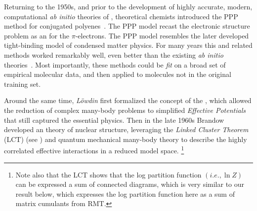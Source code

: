 Returning to the 1950s, and prior to the development of highly accurate, modern,
computational \emph{ab initio} theories of \QuantumChemistry, %
theoretical chemists introduced the \SemiEmpirical PPP method
for
conjugated polyenes~\cite{PariserParr53}.
The PPP model recast the electronic structure problem as an \emph{\EffectiveHamiltonian}
for the $\pi$-electrons.
The PPP model resembles the later developed tight-binding model of condensed matter physics\cite{Hubbard1963}.
For many years this and related \SemiEmpirical methods
worked remarkably well, even better than the existing \emph{ab initio}
theories~\cite{Dewar1975,Ridley1973,Stewart1990,Warshel1976,THIEL2005559}.
Most importantly, these methods could be \emph{fit}
on a broad set of empirical molecular data, and then applied to molecules not in the original training set.

Around the same time, \emph{Löwdin} first formalized the concept of the \EffectiveHamiltonian,
which allowed the reduction of complex many-body problems to simplified
\emph{Effective Potentials} that still captured the essential physics.
Then in the late 1960s Brandow 
developed an \EffectiveHamiltonian theory of
nuclear structure, 
leveraging the \emph{Linked Cluster Theorem} (LCT) (see \cite{Hubbard1959}) and quantum mechanical many-body theory
to describe the highly correlated effective interactions in a reduced model space.
\footnote{Note also that the LCT shows that the log partition function $(i.e., \ln Z)$ can be expressed
a sum of connected diagrams, which is very similar to our result below, which expresses the
log partition function here as a sum of matrix cumulants from RMT.}

